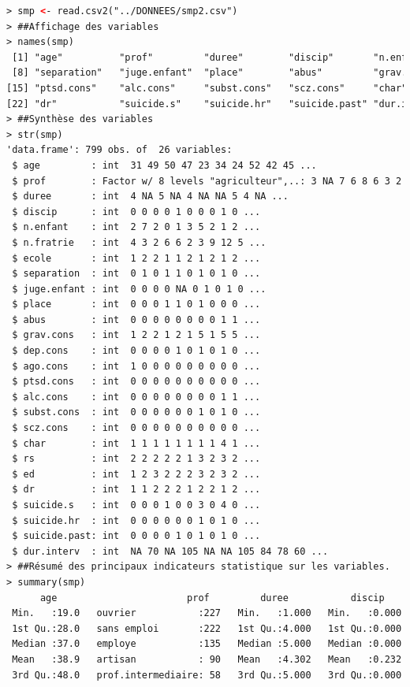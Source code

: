 \begin{lstlisting}[language=html]
> smp <- read.csv2("../DONNEES/smp2.csv")
> ##Affichage des variables
> names(smp)
 [1] "age"          "prof"         "duree"        "discip"       "n.enfant"     "n.fratrie"    "ecole"       
 [8] "separation"   "juge.enfant"  "place"        "abus"         "grav.cons"    "dep.cons"     "ago.cons"    
[15] "ptsd.cons"    "alc.cons"     "subst.cons"   "scz.cons"     "char"         "rs"           "ed"          
[22] "dr"           "suicide.s"    "suicide.hr"   "suicide.past" "dur.interv"  
> ##Synthèse des variables
> str(smp)
'data.frame': 799 obs. of  26 variables:
 $ age         : int  31 49 50 47 23 34 24 52 42 45 ...
 $ prof        : Factor w/ 8 levels "agriculteur",..: 3 NA 7 6 8 6 3 2 6 6 ...
 $ duree       : int  4 NA 5 NA 4 NA NA 5 4 NA ...
 $ discip      : int  0 0 0 0 1 0 0 0 1 0 ...
 $ n.enfant    : int  2 7 2 0 1 3 5 2 1 2 ...
 $ n.fratrie   : int  4 3 2 6 6 2 3 9 12 5 ...
 $ ecole       : int  1 2 2 1 1 2 1 2 1 2 ...
 $ separation  : int  0 1 0 1 1 0 1 0 1 0 ...
 $ juge.enfant : int  0 0 0 0 NA 0 1 0 1 0 ...
 $ place       : int  0 0 0 1 1 0 1 0 0 0 ...
 $ abus        : int  0 0 0 0 0 0 0 0 1 1 ...
 $ grav.cons   : int  1 2 2 1 2 1 5 1 5 5 ...
 $ dep.cons    : int  0 0 0 0 1 0 1 0 1 0 ...
 $ ago.cons    : int  1 0 0 0 0 0 0 0 0 0 ...
 $ ptsd.cons   : int  0 0 0 0 0 0 0 0 0 0 ...
 $ alc.cons    : int  0 0 0 0 0 0 0 0 1 1 ...
 $ subst.cons  : int  0 0 0 0 0 0 1 0 1 0 ...
 $ scz.cons    : int  0 0 0 0 0 0 0 0 0 0 ...
 $ char        : int  1 1 1 1 1 1 1 1 4 1 ...
 $ rs          : int  2 2 2 2 2 1 3 2 3 2 ...
 $ ed          : int  1 2 3 2 2 2 3 2 3 2 ...
 $ dr          : int  1 1 2 2 2 1 2 2 1 2 ...
 $ suicide.s   : int  0 0 0 1 0 0 3 0 4 0 ...
 $ suicide.hr  : int  0 0 0 0 0 0 1 0 1 0 ...
 $ suicide.past: int  0 0 0 0 1 0 1 0 1 0 ...
 $ dur.interv  : int  NA 70 NA 105 NA NA 105 84 78 60 ...
> ##Résumé des principaux indicateurs statistique sur les variables.
> summary(smp)
      age                       prof         duree           discip         n.enfant        n.fratrie     
 Min.   :19.0   ouvrier           :227   Min.   :1.000   Min.   :0.000   Min.   : 0.000   Min.   : 0.000  
 1st Qu.:28.0   sans emploi       :222   1st Qu.:4.000   1st Qu.:0.000   1st Qu.: 0.000   1st Qu.: 2.000  
 Median :37.0   employe           :135   Median :5.000   Median :0.000   Median : 1.000   Median : 3.000  
 Mean   :38.9   artisan           : 90   Mean   :4.302   Mean   :0.232   Mean   : 1.755   Mean   : 4.287  
 3rd Qu.:48.0   prof.intermediaire: 58   3rd Qu.:5.000   3rd Qu.:0.000   3rd Qu.: 3.000   3rd Qu.: 6.000  

\end{lstlisting}
